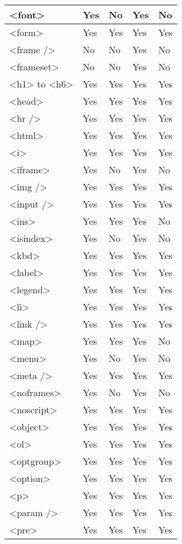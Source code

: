 \begin{longtable}{|p{70pt}|p{70pt}|p{70pt}|p{70pt}|p{70pt}|}
\hline
<font>				&Yes			&No		&Yes				&No		\\
\hline
<form>				&Yes			&Yes	&Yes				&Yes	\\
\hline
<frame />				&No				&No		&Yes				&No		\\
\hline
<frameset>			&No				&No		&Yes				&No		\\
\hline
<h1> to <h6>			&Yes			&Yes	&Yes				&Yes	\\
\hline
<head>				&Yes			&Yes	&Yes				&Yes	\\
\hline
<hr />				&Yes			&Yes	&Yes				&Yes	\\
\hline
<html>				&Yes			&Yes	&Yes				&Yes	\\
\hline
<i>					&Yes			&Yes	&Yes				&Yes	\\
\hline
<iframe>				&Yes			&No		&Yes				&No		\\
\hline
<img />				&Yes			&Yes	&Yes				&Yes	\\
\hline
<input />				&Yes			&Yes	&Yes				&Yes	\\
\hline
<ins>				&Yes			&Yes	&Yes				&No		\\
\hline
<isindex>				&Yes			&No		&Yes				&No		\\
\hline
<kbd>				&Yes			&Yes	&Yes				&Yes	\\
\hline
<label>				&Yes			&Yes	&Yes				&Yes	\\
\hline
<legend>				&Yes			&Yes	&Yes				&Yes	\\
\hline
<li>					&Yes			&Yes	&Yes				&Yes	\\
\hline
<link />				&Yes			&Yes	&Yes				&Yes	\\
\hline
<map>				&Yes			&Yes	&Yes				&No		\\
\hline
<menu>				&Yes			&No		&Yes				&No		\\
\hline
<meta />				&Yes			&Yes	&Yes				&Yes	\\
\hline
<noframes>			&Yes			&No		&Yes				&No		\\
\hline
<noscript>			&Yes			&Yes	&Yes				&Yes	\\
\hline
<object>				&Yes			&Yes	&Yes				&Yes	\\
\hline
<ol>					&Yes			&Yes	&Yes				&Yes	\\
\hline
<optgroup>			&Yes			&Yes	&Yes				&Yes	\\
\hline
<option>				&Yes			&Yes	&Yes				&Yes	\\
\hline
<p>					&Yes			&Yes	&Yes				&Yes	\\
\hline
<param />			&Yes			&Yes	&Yes				&Yes	\\
\hline
<pre>				&Yes			&Yes	&Yes				&Yes	\\

\end{longtable}
